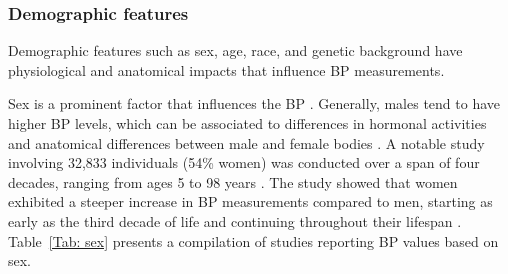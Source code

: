 \documentclass[journal,article,moreauthors]{Definitions/mdpi}
\begin{document}
\subsubsection{Demographic features} 
Demographic features such as sex, age, race, and genetic background have physiological and anatomical impacts that influence BP measurements. 

Sex is a prominent factor that influences the BP \citep{Reckelhoff2018, Sandberg2012}. Generally, males tend to have higher BP levels, which can be associated to differences in hormonal activities and anatomical differences between male and female bodies \citep{Sandberg2012, Reckelhoff2001-td}. A notable study involving 32,833 individuals (54\% women) was conducted over a span of four decades, ranging from ages 5 to 98 years \citep{Ji2020}. The study showed that women exhibited a steeper increase in BP measurements compared to men, starting as early as the third decade of life and continuing throughout their lifespan \citep{Ji2020}. Table~\ref{Tab: sex} presents a compilation of studies reporting BP values based on sex. 
\end{document}
